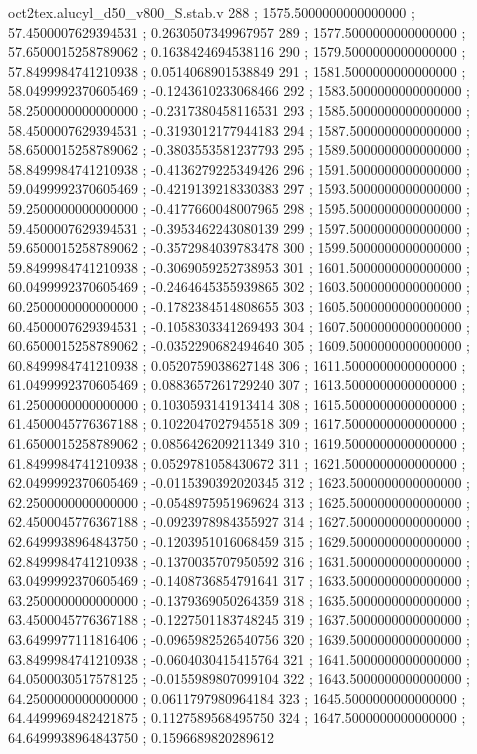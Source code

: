 \begin{filecontents}[overwrite]{oct2tex.alucyl_d50_v800_S.stab.v}
288 ; 1575.5000000000000000 ; 57.4500007629394531 ; 0.2630507349967957
289 ; 1577.5000000000000000 ; 57.6500015258789062 ; 0.1638424694538116
290 ; 1579.5000000000000000 ; 57.8499984741210938 ; 0.0514068901538849
291 ; 1581.5000000000000000 ; 58.0499992370605469 ; -0.1243610233068466
292 ; 1583.5000000000000000 ; 58.2500000000000000 ; -0.2317380458116531
293 ; 1585.5000000000000000 ; 58.4500007629394531 ; -0.3193012177944183
294 ; 1587.5000000000000000 ; 58.6500015258789062 ; -0.3803553581237793
295 ; 1589.5000000000000000 ; 58.8499984741210938 ; -0.4136279225349426
296 ; 1591.5000000000000000 ; 59.0499992370605469 ; -0.4219139218330383
297 ; 1593.5000000000000000 ; 59.2500000000000000 ; -0.4177660048007965
298 ; 1595.5000000000000000 ; 59.4500007629394531 ; -0.3953462243080139
299 ; 1597.5000000000000000 ; 59.6500015258789062 ; -0.3572984039783478
300 ; 1599.5000000000000000 ; 59.8499984741210938 ; -0.3069059252738953
301 ; 1601.5000000000000000 ; 60.0499992370605469 ; -0.2464645355939865
302 ; 1603.5000000000000000 ; 60.2500000000000000 ; -0.1782384514808655
303 ; 1605.5000000000000000 ; 60.4500007629394531 ; -0.1058303341269493
304 ; 1607.5000000000000000 ; 60.6500015258789062 ; -0.0352290682494640
305 ; 1609.5000000000000000 ; 60.8499984741210938 ; 0.0520759038627148
306 ; 1611.5000000000000000 ; 61.0499992370605469 ; 0.0883657261729240
307 ; 1613.5000000000000000 ; 61.2500000000000000 ; 0.1030593141913414
308 ; 1615.5000000000000000 ; 61.4500045776367188 ; 0.1022047027945518
309 ; 1617.5000000000000000 ; 61.6500015258789062 ; 0.0856426209211349
310 ; 1619.5000000000000000 ; 61.8499984741210938 ; 0.0529781058430672
311 ; 1621.5000000000000000 ; 62.0499992370605469 ; -0.0115390392020345
312 ; 1623.5000000000000000 ; 62.2500000000000000 ; -0.0548975951969624
313 ; 1625.5000000000000000 ; 62.4500045776367188 ; -0.0923978984355927
314 ; 1627.5000000000000000 ; 62.6499938964843750 ; -0.1203951016068459
315 ; 1629.5000000000000000 ; 62.8499984741210938 ; -0.1370035707950592
316 ; 1631.5000000000000000 ; 63.0499992370605469 ; -0.1408736854791641
317 ; 1633.5000000000000000 ; 63.2500000000000000 ; -0.1379369050264359
318 ; 1635.5000000000000000 ; 63.4500045776367188 ; -0.1227501183748245
319 ; 1637.5000000000000000 ; 63.6499977111816406 ; -0.0965982526540756
320 ; 1639.5000000000000000 ; 63.8499984741210938 ; -0.0604030415415764
321 ; 1641.5000000000000000 ; 64.0500030517578125 ; -0.0155989807099104
322 ; 1643.5000000000000000 ; 64.2500000000000000 ; 0.0611797980964184
323 ; 1645.5000000000000000 ; 64.4499969482421875 ; 0.1127589568495750
324 ; 1647.5000000000000000 ; 64.6499938964843750 ; 0.1596689820289612

\end{filecontents}

